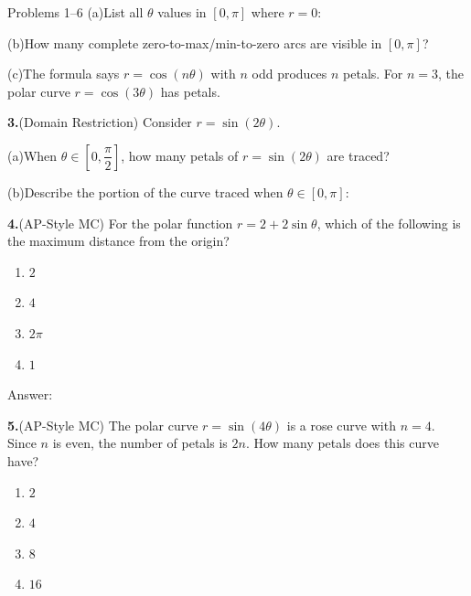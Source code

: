 \documentclass[10pt]{article}
\begin{document}
\begin{notesbox}{Problems 1--6}
\vspace{4pt}
(a)\quad List all $\theta$ values in $[0, \pi]$ where $r = 0$:
\underline{\hspace{5cm}}

\vspace{4pt}
(b)\quad How many complete zero-to-max/min-to-zero arcs are visible in $[0, \pi]$?
\underline{\hspace{1.5cm}}

\vspace{4pt}
(c)\quad The formula says $r = \cos(n\theta)$ with $n$ odd produces $n$ petals.
For $n = 3$, the polar curve $r = \cos(3\theta)$ has \underline{\hspace{1cm}} petals.

\vspace{0.14in}
\textbf{3.}\quad (Domain Restriction) Consider $r = \sin(2\theta)$.

\vspace{4pt}
(a)\quad When $\theta \in \left[0, \dfrac{\pi}{2}\right]$, how many petals of
$r = \sin(2\theta)$ are traced? \underline{\hspace{1.5cm}}

\vspace{4pt}
(b)\quad Describe the portion of the curve traced when $\theta \in [0, \pi]$:

\vspace{0.14in}
\textbf{4.}\quad (AP-Style MC) For the polar function $r = 2 + 2\sin\theta$, which
of the following is the maximum distance from the origin?

\begin{enumerate}[label=(\Alph*), leftmargin=2em, itemsep=3pt]
  \item $2$
  \item $4$
  \item $2\pi$
  \item $1$
\end{enumerate}

Answer: \underline{\hspace{1.5cm}}

\vspace{0.14in}
\textbf{5.}\quad (AP-Style MC) The polar curve $r = \sin(4\theta)$ is a rose curve
with $n = 4$. Since $n$ is even, the number of petals is $2n$. How many petals does
this curve have?

\begin{enumerate}[label=(\Alph*), leftmargin=2em, itemsep=3pt]
  \item $2$
  \item $4$
  \item $8$
  \item $16$
\end{enumerate}


\end{notesbox}
\end{document}
